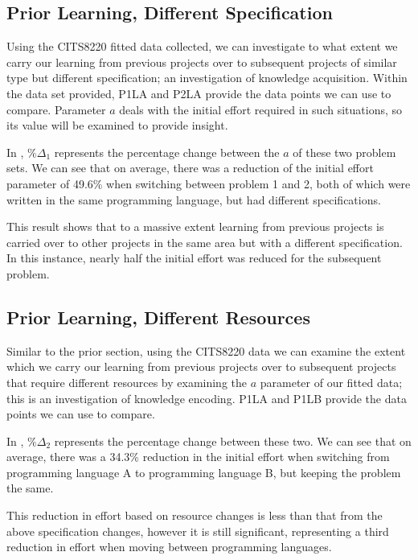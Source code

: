 \documentclass[a4paper,10pt]{article}
\begin{document}
\subsection{Prior Learning, Different Specification}
Using the CITS8220 fitted data collected, we can investigate to what extent we carry our learning from previous projects over to subsequent projects of similar type but different specification; an investigation of knowledge acquisition. Within the data set provided, P1LA and P2LA provide the data points we can use to compare. Parameter $a$ deals with the initial effort required in such situations, so its value will be examined to provide insight.

In , $\%\Delta_1$ represents the percentage change between the $a$ of these two problem sets. We can see that on average, there was a reduction of the initial effort parameter of 49.6\% when switching between problem 1 and 2, both of which were written in the same programming language, but had different specifications.

This result shows that to a massive extent learning from previous projects is carried over to other projects in the same area but with a different specification. In this instance, nearly half the initial effort was reduced for the subsequent problem.

\subsection{Prior Learning, Different Resources}
Similar to the prior section, using the CITS8220 data we can examine the extent which we carry our learning from previous projects over to subsequent projects that require different resources by examining the $a$ parameter of our fitted data; this is an investigation of knowledge encoding. P1LA and P1LB provide the data points we can use to compare.

In , $\%\Delta_2$ represents the percentage change between these two. We can see that on average, there was a 34.3\% reduction in the initial effort when switching from programming language A to programming language B, but keeping the problem the same. 

This reduction in effort based on resource changes is less than that from the above specification changes, however it is still significant, representing a third reduction in effort when moving between programming languages.
\end{document}
